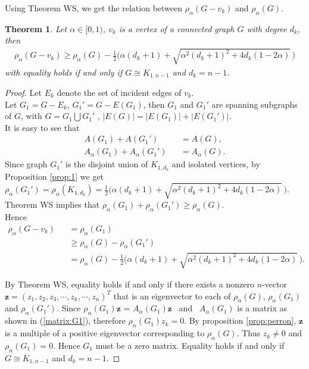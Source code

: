 \documentclass[amsthm]{elsart}
\newtheorem{theorem}{Theorem}[section]
\begin{document}
Using Theorem WS, we get the relation between $\rho _\alpha (G - v_k)$ and $\rho _\alpha (G)$.
\begin{theorem} \label{the:0}
Let $\alpha \in [0, 1)$, $v_k$ is a vertex of a connected graph $G$ with degree $d_k$, then
\begin{eqnarray*}
\rho _\alpha (G - v_k) \geqslant \rho _\alpha (G) - \frac{1}{2} \big( \alpha (d_k + 1) + \sqrt{\alpha ^2 (d_k + 1)^2 + 4 d_k (1-2\alpha)} \, \big)
\end{eqnarray*}
with equality holds if and only if $G \cong K_{1,n-1}$ and $d_k = n - 1$.
\end{theorem}
\begin{proof} Let $E_k $ denote the set of incident edges of $v_k$.
 \\ Let $G_1 = G - E_k$, $G_1' = G - E(G_1)$,
 then $G_1$ and $G_1'$ are spanning subgraphs of $G$, with
 $G = G_1 \bigcup G_1'$ ,
 $|E(G)| = |E(G_1)| + |E(G_1')|$.
\\ It is easy to see that
\begin{eqnarray*}
 A(G_1) + A(G_1') \quad &&= A(G),
\\  A_\alpha (G_1) + A_\alpha (G_1') &&= A_\alpha (G).
\end{eqnarray*}
 Since graph $G_1'$ is the disjoint union of $K_{1,d_k}$ and isolated vertices, by Proposition \ref{prop:1} we get $\rho _\alpha (G_1') = \rho _\alpha (K_{1,d_k}) = \frac{1}{2} \big( \alpha (d_k + 1) + \sqrt{\alpha ^2 (d_k + 1)^2 + 4 d_k (1-2\alpha)} \, \big). $
\\ Theorem WS implies that $\rho _\alpha (G_1) + \rho _\alpha (G_1') \geqslant \rho _\alpha (G)$.
\\ Hence
\begin{eqnarray*}
\rho _\alpha (G - v_k) &&= \rho _\alpha (G_1)
\\ && \geqslant \rho _\alpha (G) - \rho _\alpha (G_1')
\\ && = \rho _\alpha (G) - \frac{1}{2} \big( \alpha (d_k + 1) + \sqrt{\alpha ^2 (d_k + 1)^2 + 4 d_k (1-2\alpha)} \, \big).
\end{eqnarray*}

By Theorem WS, equality holds if and only if there exists a nonzero $n$-vector $\textbf{z} = (z_1, z_2,z_3, \cdots,z_k, \cdots, z_n)^T$ that is an eigenvector to each of $\rho _\alpha (G)$, $\rho _\alpha (G_1)$ and $\rho _\alpha (G_1')$. Since $\rho _\alpha (G_1) \textbf{z}$ = $A_\alpha (G_1) \textbf{z}$ \  and \ $A_\alpha (G_1)$ is a matrix as shown in (\ref{matrix:G1}), therefore  $\rho _\alpha (G_1) z_k = 0$. By proposition \ref{prop:perron}, $\textbf{z}$ is a multiple of a positive eigenvector corresponding to $\rho _\alpha (G)$. Thus $z_k \neq 0$ and $\rho _\alpha (G_1) = 0$. Hence $G_1$ must be a zero matrix. Equality holds if and only if $G \cong K_{1,n-1}$ and $d_k = n - 1$.
\end{proof}
\end{document}
